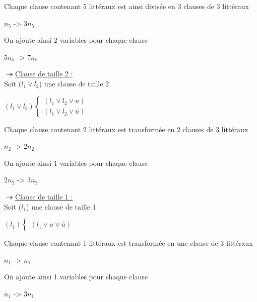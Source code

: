 \documentclass[]{article}
\begin{document}
\begin{enumerate}
\begin{enumerate}
      Chaque clause contenant 5 littéraux est ainsi divisée en 3 clauses de 3 littéraux
      \begin{center}
        $n_5$ -> 3$n_5$
      \end{center}
      On ajoute ainsi 2 variables pour chaque clause
      \begin{center}
        5$n_5$ -> 7$n_5$
      \end{center}
      \bigbreak

      $\twoheadrightarrow$\underline{Clause de taille 2 :}\\
      Soit ($l_1 \vee l_2$) une clause de taille 2

      \begin{center}
      $(l_1 \vee l_2)\left\lbrace
      \begin{array}{lcl} 
        (l_1 \vee l_2 \vee u)\\
        (l_1 \vee l_2 \vee \overline u)
      \end{array}\right.$
      \end{center}

      Chaque clause contenant 2 littéraux est transformée en 2 clauses de 3 littéraux
      \begin{center}
        $n_2$ -> 2$n_2$
      \end{center}
      On ajoute ainsi 1 variables pour chaque clause
      \begin{center}
        2$n_2$ -> 3$n_2$
      \end{center}
      \bigbreak


      $\twoheadrightarrow$\underline{Clause de taille 1 :}\\
      Soit ($l_1$) une clause de taille 1

      \begin{center}
      $(l_1)\left\lbrace 
      \begin{array}{lcl} 
        (l_1 \vee u \vee \overline u)
      \end{array}\right.$
      \end{center}

      Chaque clause contenant 1 littéraux est transformée en une clause de 3 littéraux
      \begin{center}
        $n_1$ -> $n_1$
      \end{center}
      On ajoute ainsi 1 variables pour chaque clause
      \begin{center}
        $n_1$ -> 3$n_1$
      \end{center}
      \bigbreak


\end{enumerate}
\end{enumerate}
\end{document}
